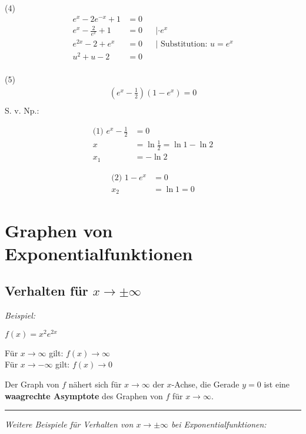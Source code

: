 (4)
\begin{align*}
    e^x - 2 e^{-x} +1 & = 0 \\
    e^x - \frac{2}{e^x} +1 & = 0  && | \cdot e^x\\
    e^{2x} -2 + e^x & = 0  && | \text{ Substitution: } u = e^x \\
    u^2 + u -2 & = 0 \\
\end{align*} 

(5)
\begin{align*}
    \left(e^x - \frac{1}{2}\right) \left(1 - e^x\right) = 0 \\
\end{align*} 
S. v. Np.:

\begin{minipage}[t]{0.5\textwidth}
    \begin{align*}
        \text{(1) }e^x - \frac{1}{2} & = 0 \\
        x & = \ln{\frac{1}{2}} = \ln{1} - \ln{2} \\
        x_1 & = - \ln{2}
    \end{align*}
\end{minipage}
\begin{minipage}[t]{0.5\textwidth}
    \begin{align*}
        \text{(2) }1 - e^x & = 0\\
        x_2 & = \ln{1} = 0
    \end{align*}
\end{minipage}

\section{Graphen von Exponentialfunktionen}
\subsection{Verhalten für $x \to \pm \infty$}
\textit{Beispiel:}

$f(x) = x^2e^{2x}$

Für $x \to \infty$ gilt: $f(x) \to \infty$ \\
Für $x \to - \infty$ gilt: $f(x) \to 0$

Der Graph von $f$ nähert sich für $x \to \infty$ der $x$-Achse, die Gerade $y = 0$ ist eine \textbf{waagrechte Asymptote} des Graphen von $f$ für $x \to \infty$.

\noindent\rule{\textwidth}{1pt}

\textit{Weitere Beispiele für Verhalten von $x \to \pm \infty$ bei Exponentialfunktionen:}

